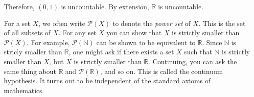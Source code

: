 \documentclass[crop=false,class=book,oneside]{standalone}
\begin{document}
            Therefore, $(0,1)$ is uncountable. By extension,
            $\mathbb{R}$ is uncountable.
            \par\hfill\par
            \vspace{-2ex}
            For a set $X$, we often write
            $\mathcal{P}(X)$ to denote the
            \textit{power set} of $X$. This is the
            set of all subsets of $X$.
            For any set $X$ you can show that $X$ is
            strictly smaller than $\mathcal{P}(X)$.
            For example, $\mathcal{P}(\mathbb{N})$
            can be shown to be equivalent to $\mathbb{R}$.
            Since $\mathbb{N}$ is stricly smaller than
            $\mathbb{R}$, one might ask if there exists
            a set $X$ such that $\mathbb{N}$ is strictly
            smaller than $X$, but $X$ is strictly smaller
            than $\mathbb{R}$. Continuing, you can ask the
            same thing about $\mathbb{R}$ and
            $\mathcal{P}(\mathbb{R})$, and so on.
            This is called the continuum hypothesis.
            It turns out to be independent of
            the standard axioms of mathematics.
\end{document}

